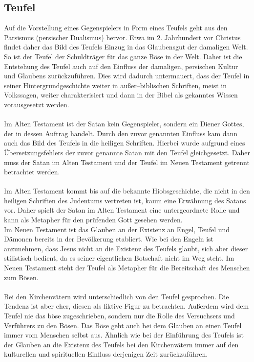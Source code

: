 \subsection{Teufel}\label{sec:Teufel}
Auf die Vorstellung eines Gegenspielers in Form eines Teufels geht aus den Parsismus (persischer Dualismus) hervor. Etwa im 2. Jahrhundert vor Christus findet daher das Bild des Teufels Einzug in das Glaubensgut der damaligen Welt. So ist der Teufel der Schuldträger für das ganze Böse in der Welt. Daher ist die Entstehung
des Teufel auch auf den Einfluss der damaligen, persischen Kultur und Glaubens zurückzuführen. Dies wird dadurch untermauert, dass der Teufel in seiner Hintergrundgeschichte weiter in außer--biblischen Schriften, meist in Volkssagen, weiter charakterisiert und dann in der Bibel als gekanntes Wissen vorausgesetzt werden.
\\~\\
Im Alten Testament ist der Satan kein Gegenspieler, sondern ein Diener Gottes, der in dessen Auftrag handelt. Durch den zuvor genannten Einfluss kam dann auch das Bild des Teufels in die heiligen Schriften. Hierbei wurde aufgrund eines Übersetzungsfehlers der zuvor genannte Satan mit den Teufel gleichgesetzt.
Daher muss der Satan im Alten Testament und der Teufel im Neuen Testament getrennt betrachtet werden.
\\~\\
Im Alten Testament kommt bis auf die bekannte Hiobsgeschichte, die nicht in den heiligen Schriften des Judentums vertreten ist, kaum eine Erwähnung des Satans vor. Daher spielt der Satan im Alten Testament eine untergeordnete Rolle und kann als Metapher für den prüfenden Gott gesehen werden. \\ Im Neuen Testament ist das Glauben an der Existenz an Engel, Teufel und Dämonen bereits in der Bevölkerung etabliert. Wie bei den Engeln ist anzunehmen, dass Jesus nicht an die Existenz des Teufels glaubt, sich aber dieser stilistisch bedient, da es seiner eigentlichen Botschaft nicht im Weg steht. Im Neuen Testament steht der Teufel als Metapher
für die Bereitschaft  des Menschen zum Bösen.
\\~\\
Bei den Kirchenvätern wird unterschiedlich von den Teufel gesprochen. Die Tendenz ist aber eher, diesen als fiktive Figur zu betrachten. Außerdem wird dem Teufel nie das böse zugeschrieben, sondern nur die Rolle des Versuchsers und Verführers zu den Bösen. Das Böse geht auch bei dem Glauben an einen Teufel immer vom Menschen selbst aus. Ähnlich wie bei der Einführung des Teufels ist der Glauben an die Existenz des Teufels bei den Kirchenvätern immer auf den kulturellen und spirituellen Einfluss derjenigen Zeit zurückzuführen.
